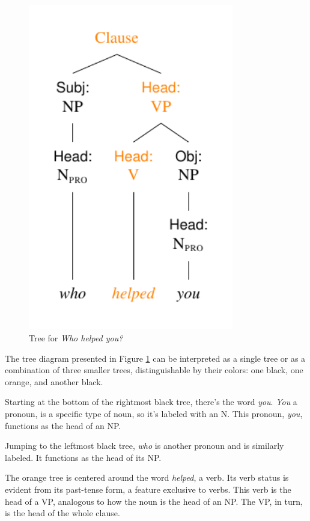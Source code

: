 \begin{figure} %
  \centering
  \includegraphics[width=0.8\textwidth]{figures/whohelpedyou.pdf}
  \caption{Tree for \textit{Who helped you?}}
  \label{fig:tree3}
\end{figure}

The tree diagram presented in Figure \ref{fig:tree3} can be interpreted as a single tree or as a combination of three smaller trees, distinguishable by their colors: one black, one orange, and another black.

Starting at the bottom of the rightmost black tree, there's the word \textit{you}. \textit{You} a pronoun, is a specific type of noun, so it's labeled with an N. This pronoun, \textit{you}, functions as the head of an NP.

Jumping to the leftmost black tree, \textit{who} is another pronoun and is similarly labeled. It functions as the head of its NP.

The orange tree is centered around the word \textit{helped}, a verb. Its verb status is evident from its past-tense form, a feature exclusive to verbs. This verb is the head of a VP, analogous to how the noun is the head of an NP. The VP, in turn, is the head of the whole clause.

